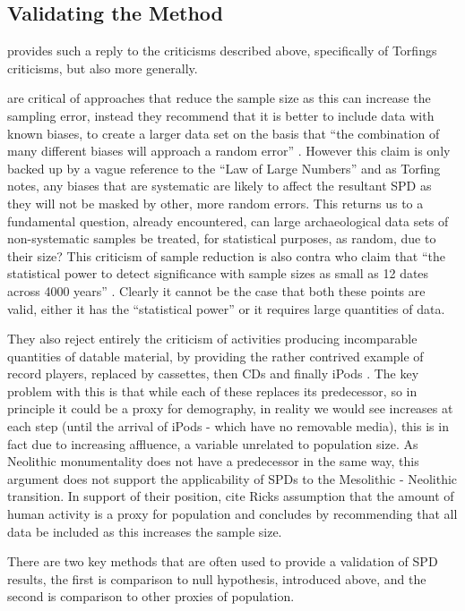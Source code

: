 \subsection{Validating the Method}
\citet{Timpson2015199} provides such a reply to the criticisms described above, specifically of Torfings criticisms, but also more generally. 

\citet{Timpson2015199} are critical of approaches that reduce the sample size as this can increase the sampling error, instead they recommend that it is better to include data with known biases, to create a larger data set on the basis that ``the combination of many different biases will approach a random error'' \citep[201]{Timpson2015199}. However this claim is only backed up by a vague reference to the ``Law of Large Numbers'' and as Torfing notes, any biases that are systematic are likely to affect the resultant SPD as they will not be masked by other, more random errors. This returns us to a fundamental question, already encountered, can large archaeological data sets of non-systematic samples be treated, for statistical purposes, as random, due to their size? This criticism of sample reduction is also contra \citet{TIMPSON2014549} who claim that ``the statistical power to detect significance with sample sizes as small as 12 dates across 4000 years'' \citep[552]{TIMPSON2014549}. Clearly it cannot be the case that both these points are valid, either it has the ``statistical power'' or it requires large quantities of data.

They also reject entirely the criticism of activities producing incomparable quantities of datable material, by providing the rather contrived example of record players, replaced by cassettes, then CDs and finally iPods \citep[201]{Timpson2015199}. The key problem with this is that while each of these replaces its predecessor, so in principle it could be a proxy for demography, in reality we would see increases at each step (until the arrival of iPods - which have no removable media), this is in fact due to increasing affluence, a variable unrelated to population size. As Neolithic monumentality does not have a predecessor in the same way, this argument does not support the applicability of SPDs to the Mesolithic - Neolithic transition. In support of their position, \citet{Timpson2015199} cite Ricks assumption that  the amount of human activity is a proxy for population and concludes by recommending that all data be included as this increases the sample size.

There are two key methods that are often used to provide a validation of SPD results, the first is comparison to null hypothesis, introduced above, and the second is comparison to other proxies of population.

